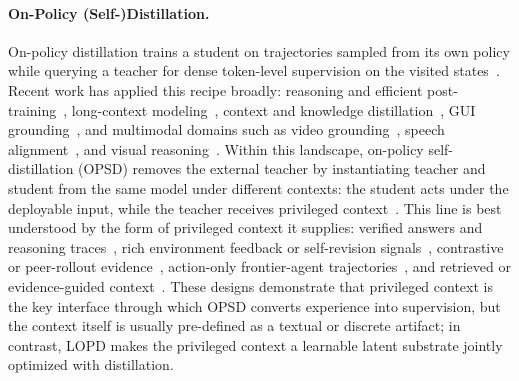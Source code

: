 \documentclass{article} %
\newcommand{\ourmethod}{{\textsc{LOPD}}\xspace}
\begin{document}
\paragraph{On-Policy (Self-)Distillation.}
On-policy distillation trains a student on trajectories sampled from its own policy while querying a teacher for dense token-level supervision on the visited states~\citep{song2026surveyonpolicydistillationlarge,li2026rethinkingonpolicydistillationlarge}.
Recent work has applied this recipe broadly: reasoning and efficient post-training~\citep{2604.13010,2603.07079,2603.25562}, long-context modeling~\citep{2604.17535}, context and knowledge distillation~\citep{ye2026onpolicycontextdistillationlanguage,edgeopd2026internalizingprivilegedcontext}, GUI grounding~\citep{2605.00642}, and multimodal domains such as video grounding~\citep{2602.02994}, speech alignment~\citep{2603.24596}, and visual reasoning~\citep{2605.18740,2605.21924}.
Within this landscape, on-policy self-distillation (OPSD) removes the external teacher by instantiating teacher and student from the same model under different contexts: the student acts under the deployable input, while the teacher receives privileged context~\citep{zhao2026selfdistilledreasoneronpolicyselfdistillation,hbotter2026reinforcementlearningselfdistillation,penaloza2026privilegedinformationdistillation,yang2026selfdistilledrlvr,yu2026dopd}.
This line is best understood by the form of privileged context it supplies: verified answers and reasoning traces~\citep{zhao2026selfdistilledreasoneronpolicyselfdistillation,yang2026selfdistilledrlvr}, rich environment feedback or self-revision signals~\citep{hbotter2026reinforcementlearningselfdistillation,2604.12002,2605.12741}, contrastive or peer-rollout evidence~\citep{2605.12652,2606.11709}, action-only frontier-agent trajectories~\citep{penaloza2026privilegedinformationdistillation}, and retrieved or evidence-guided context~\citep{ye2026onpolicycontextdistillationlanguage,edgeopd2026internalizingprivilegedcontext}.
These designs demonstrate that privileged context is the key interface through which OPSD converts experience into supervision, but the context itself is usually pre-defined as a textual or discrete artifact; in contrast, \ourmethod makes the privileged context a learnable latent substrate jointly optimized with distillation.

\vspace{-0.6em}
\end{document}
